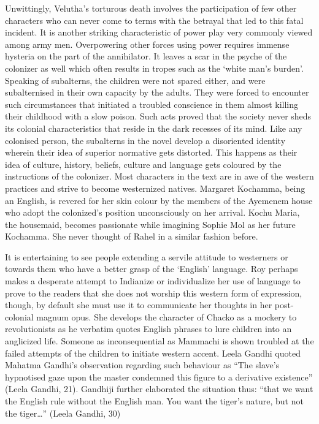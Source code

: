 Unwittingly, Velutha’s torturous death involves the participation of few other characters who can never come to terms with the betrayal that led to this fatal incident. It is another striking characteristic of power play very commonly viewed among army men. Overpowering other forces using power requires immense hysteria on the part of the annihilator. It leaves a scar in the psyche of the colonizer as well which often results in tropes such as the ‘white man’s burden’. Speaking of subalterns, the children were not spared either, and were subalternised in their own capacity by the adults. They were forced to encounter such circumstances that initiated a troubled conscience in them almost killing their childhood with a slow poison. Such acts proved that the society never sheds its colonial characteristics that reside in the dark recesses of its mind. Like any colonised person, the subalterns in the novel develop a disoriented identity wherein their idea of superior normative gets distorted. This happens as their idea of culture, history, beliefs, culture and language gets coloured by the instructions of the colonizer. Most characters in the text are in awe of the western practices and strive to become westernized natives. Margaret Kochamma, being an English, is revered for her skin colour by the members of the Ayemenem house who adopt the colonized’s position unconsciously on her arrival. Kochu Maria, the housemaid, becomes passionate while imagining Sophie Mol as her future Kochamma. She never thought of Rahel in a similar fashion before.

It is entertaining to see people extending a servile attitude to westerners or towards them who have a better grasp of the ‘English’ language. Roy perhaps makes a desperate attempt to Indianize or individualize her use of language to prove to the readers that she does not worship this western form of expression, though, by default she must use it to communicate her thoughts in her post-colonial magnum opus. She develops the character of Chacko as a mockery to revolutionists as he verbatim quotes English phrases to lure children into an anglicized life.  Someone as inconsequential as Mammachi is shown troubled at the failed attempts of the children to initiate western accent. Leela Gandhi quoted Mahatma Gandhi’s observation regarding such behaviour as “The slave’s hypnotised gaze upon the master condemned this figure to a derivative existence” (Leela Gandhi, 21). Gandhiji further elaborated the situation thus: “that we want the English rule without the English man. You want the tiger’s nature, but not the tiger…” (Leela Gandhi, 30)

